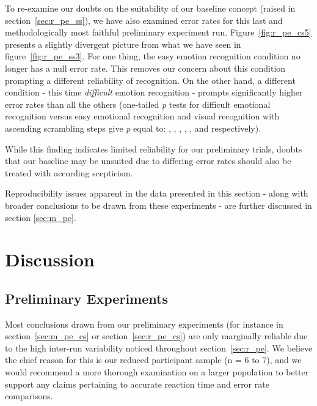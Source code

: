 	    To re-examine our doubts on the suitability of our baseline concept (raised in section~\ref{sec:r_pe_ss}), we have also examined error rates for this last and methodologically most faithful preliminary experiment run.
	    Figure~\ref{fig:r_pe_cs5} presents a slightly divergent picture from what we have seen in figure~\ref{fig:r_pe_ss3}.
	    For one thing, the easy emotion recognition condition no longer has a null error rate.
	    This removes our concern about this condition prompting a different reliability of recognition.
	    On the other hand, a different condition - this time \textit{difficult} emotion recognition - prompts significantly higher error rates than all the others
	    (one-tailed \textit{p} tests for difficult emotional recognition versus easy emotional recognition and visual recognition with ascending scrambling steps give \textit{p} equal to:
	    ,
	    ,
	    ,
	    ,
	    , and
	    respectively).
	    
	    While this finding indicates limited reliability for our preliminary trials, doubts that our baseline may be unsuited due to differing error rates should also be treated with according scepticism.
	    
	    Reproducibility issues apparent in the data presented in this section - along with broader conclusions to be drawn from these experiments - are further discussed in section \ref{sec:m_pe}.
\chapter{Discussion}
    \section{Preliminary Experiments}\label{sec:d_pe}
	Most conclusions drawn from our preliminary experiments (for instance in section~\ref{sec:m_pe_cs} or section~\ref{sec:r_pe_cs}) are only marginally reliable due to the high inter-run variability noticed throughout section~\ref{sec:r_pe}.
	We believe the chief reason for this is our reduced participant sample (n = 6 to 7), and we would recommend a more thorough examination on a larger population to better support any claims pertaining to accurate reaction time and error rate comparisons.
	
